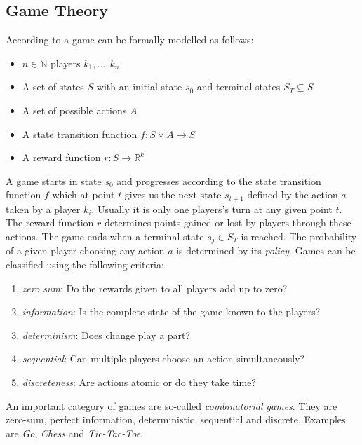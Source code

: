 \subsection{Game Theory}
\label{ss:game_theory}
According to \cite{browne2012survey} a game can be formally modelled as follows:
\begin{itemize}[noitemsep]
    \item $n \in \mathbb{N}$ players $k_1, \ldots, k_n$
    \item A set of states $S$ with an initial state $s_0$ and terminal states $S_T \subseteq S$
    \item A set of possible actions $A$
    \item A state transition function $f: S \times A \to S$
    \item A reward function $r: S \to \mathbb{R}^k$
\end{itemize}
A game starts in state $s_0$ and progresses according to the state transition function $f$ which at point $t$ gives us the next state $s_{t+1}$ defined by the action $a$ taken by a player $k_i$. Usually it is only one players's turn at any given point $t$. The reward function $r$ determines points gained or lost by players through these actions. The game ends when a terminal state $s_j \in S_T$ is reached. The probability of a given player choosing any action $a$ is determined by its \textit{policy}. Games can be classified using the following criteria:
\begin{enumerate}[label=\alph*)]
    \item \textit{zero sum}: Do the rewards given to all players add up to zero?
    \item \textit{information}: Is the complete state of the game known to the players?
    \item \textit{determinism}: Does change play a part?
    \item \textit{sequential}: Can multiple players choose an action simultaneously?
    \item \textit{discreteness}: Are actions atomic or do they take time? 
\end{enumerate}
An important category of games are so-called \textit{combinatorial games}. They are zero-sum, perfect information, deterministic, sequential and discrete. Examples are \textit{Go}, \textit{Chess} and \textit{Tic-Tac-Toe}.

